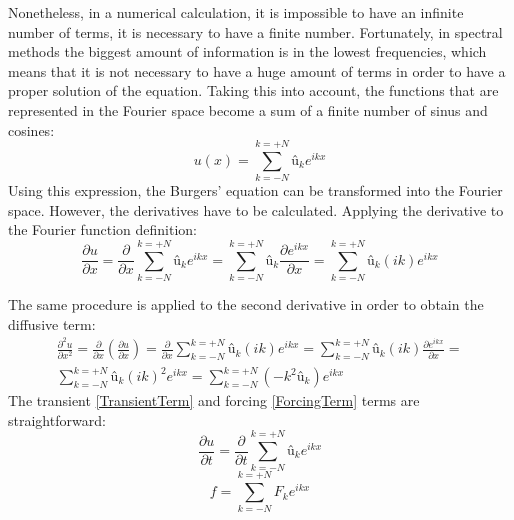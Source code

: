 Nonetheless, in a numerical calculation, it is impossible to have an infinite number of terms, it is necessary to have a finite number. Fortunately, in spectral methods the biggest amount of information is in the lowest frequencies, which means that it is not necessary to have a huge amount of terms in order to have a proper solution of the equation. Taking this into account, the functions that are represented in the Fourier space become a sum of a finite number of sinus and cosines:
\begin{equation}
u\left(x\right)=\sum_{k=-N}^{k=+N}û_{k}e^{ikx}
\end{equation}
Using this expression, the Burgers' equation can be transformed into the Fourier space. However, the derivatives have to be calculated. Applying the derivative to the Fourier function definition:
\begin{equation}
\frac{\partial u}{\partial x}=\frac{\partial}{\partial x}\sum_{k=-N}^{k=+N}û_{k}e^{ikx}=\sum_{k=-N}^{k=+N}û_{k}\frac{\partial e^{ikx}}{\partial x}=\sum_{k=-N}^{k=+N}û_{k}\left(ik\right)e^{ikx}
\end{equation}

The same procedure is applied to the second derivative in order to obtain the diffusive term:
\begin{multline}
\frac{\partial^{2}u}{\partial x^{2}}=\frac{\partial}{\partial x}\left(\frac{\partial u}{\partial x}\right)=\frac{\partial}{\partial x}\sum_{k=-N}^{k=+N}û_{k}\left(ik\right)e^{ikx}=\sum_{k=-N}^{k=+N}û_{k}\left(ik\right)\frac{\partial e^{ikx}}{\partial x}= \\
\sum_{k=-N}^{k=+N}û_{k}\left(ik\right)^{2}e^{ikx}=\sum_{k=-N}^{k=+N}\left(-k^{2}û_{k}\right)e^{ikx}
\end{multline}
The transient \ref{TransientTerm} and forcing \ref{ForcingTerm} terms are straightforward:
\begin{equation}
\frac{\partial u}{\partial t}=\frac{\partial}{\partial t}\sum_{k=-N}^{k=+N}û_{k}e^{ikx}
\label{TransientTerm}
\end{equation}
\begin{equation}
f=\sum_{k=-N}^{k=+N}F_{k}e^{ikx}
\label{ForcingTerm}
\end{equation}

